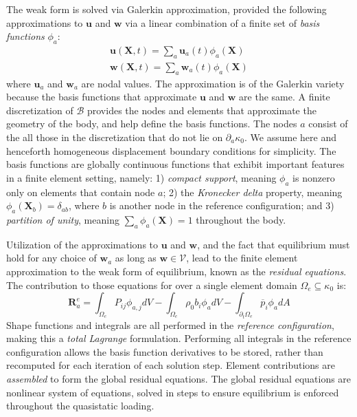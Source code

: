 The weak form is solved via Galerkin approximation, provided the following approximations to $\bm{u}$ and $\bm{w}$ via a linear combination of a finite set of \textit{basis functions} $\phi_a$:
\begin{gather}
\bm{u}(\bm{X},t) = \sum\limits_{a}\bm{u}_a(t)\phi_a(\bm{X}) \\
\bm{w}(\bm{X},t) = \sum\limits_{a}\bm{w}_a(t)\phi_a(\bm{X})
\end{gather}
where $\bm{u}_a$ and $\bm{w}_a$ are nodal values. The approximation is of the Galerkin variety because the basis functions that approximate $\bm{u}$ and $\bm{w}$ are the same. A finite discretization of $\mathcal{B}$ provides the nodes and elements that approximate the geometry of the body, and help define the basis functions. The nodes $a$ consist of the all those in the discretization that do not lie on $\partial_a\kappa_0$. We assume here and henceforth homogeneous displacement boundary conditions for simplicity. The basis functions are globally continuous functions that exhibit important features in a finite element setting, namely: 1) \textit{compact support}, meaning $\phi_a$ is nonzero only on elements that contain node $a$; 2) the \textit{Kronecker delta} property, meaning $\phi_a(\bm{X}_b) = \delta_{ab}$, where $b$ is another node in the reference configuration; and 3) \textit{partition of unity}, meaning $\sum\limits_a\phi_a(\bm{X}) = 1$ throughout the body.

Utilization of the approximations to $\bm{u}$ and $\bm{w}$, and the fact that equilibrium must hold for any choice of $\bm{w}_a$ as long as $\bm{w} \in \mathcal{V}$, lead to the finite element approximation to the weak form of equilibrium, known as the \textit{residual equations}. The contribution to those equations for over a single element domain $\Omega_e \subseteq \kappa_0$ is:
\begin{equation}
\bm{R}^e_a = \int_{\Omega_e}P_{ij}\phi_{a,j}dV - \int_{\Omega_e}\rho_0b_i\phi_adV - \int_{\partial_t\Omega_e} \overline{p}_i\phi_adA
\end{equation}
Shape functions and integrals are all performed in the \textit{reference configuration}, making this a \textit{total Lagrange} formulation. Performing all integrals in the reference configuration allows the basis function derivatives to be stored, rather than recomputed for each iteration of each solution step. Element contributions are \textit{assembled} to form the global residual equations. The global residual equations are nonlinear system of equations, solved in steps to ensure equilibrium is enforced throughout the quasistatic loading.

